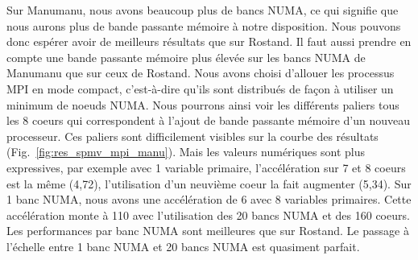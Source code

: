 Sur Manumanu, nous avons beaucoup plus de bancs NUMA, ce qui signifie que nous aurons plus de bande passante mémoire à notre disposition.
%
Nous pouvons donc espérer avoir de meilleurs résultats que sur Rostand.
%
Il faut aussi prendre en compte une bande passante mémoire plus élevée sur les bancs NUMA de Manumanu que sur ceux de Rostand.
%
Nous avons choisi d'allouer les processus MPI en mode compact, c'est-à-dire qu'ils sont distribués de façon à utiliser un minimum de noeuds NUMA.
%
Nous pourrons ainsi voir les différents paliers tous les 8 coeurs qui correspondent à l'ajout de bande passante mémoire d'un nouveau processeur.
%
Ces paliers sont difficilement visibles sur la courbe des résultats (Fig.~\ref{fig:res_spmv_mpi_manu}).
%
Mais les valeurs numériques sont plus expressives, par exemple avec 1 variable primaire, l'accélération sur 7 et 8 coeurs est la même (4,72), l'utilisation d'un neuvième coeur la fait augmenter (5,34).
%
Sur 1 banc NUMA, nous avons une accélération de 6 avec 8 variables primaires.
%
Cette accélération monte à 110 avec l'utilisation des 20 bancs NUMA et des 160 coeurs.
%
Les performances par banc NUMA sont meilleures que sur Rostand.
%
Le passage à l'échelle entre 1 banc NUMA et 20 bancs NUMA est quasiment parfait.
